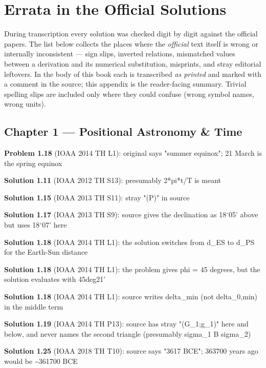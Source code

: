 \chapter{Errata in the Official Solutions}
\label{ch:errata}

During transcription every solution was checked digit by digit against
the official papers. The list below collects the places where the
\emph{official} text itself is wrong or internally inconsistent ---
sign slips, inverted relations, mismatched values between a derivation
and its numerical substitution, misprints, and stray editorial leftovers.
In the body of this book each is transcribed \emph{as printed} and
marked with a comment in the source; this appendix is the reader-facing
summary. Trivial spelling slips are included only where they could
confuse (wrong symbol names, wrong units).

\section*{Chapter 1 --- Positional Astronomy \& Time}

\noindent\textbf{Problem 1.18} (IOAA 2014 TH L1): original says "summer equinox"; 21 March is the spring equinox
\smallskip

\noindent\textbf{Solution 1.11} (IOAA 2012 TH S13): presumably 2*pi*t/T is meant
\smallskip

\noindent\textbf{Solution 1.15} (IOAA 2013 TH S11): stray "(P)" in source
\smallskip

\noindent\textbf{Solution 1.17} (IOAA 2013 TH S9): source gives the declination as 18$^\circ$05' above but uses 18$^\circ$07' here
\smallskip

\noindent\textbf{Solution 1.18} (IOAA 2014 TH L1): the solution switches from d\_ES to d\_PS for the Earth-Sun distance
\smallskip

\noindent\textbf{Solution 1.18} (IOAA 2014 TH L1): the problem gives phi = 45 degrees, but the solution evaluates with 45deg21'
\smallskip

\noindent\textbf{Solution 1.18} (IOAA 2014 TH L1): source writes delta\_min (not delta\_0,min) in the middle term
\smallskip

\noindent\textbf{Solution 1.19} (IOAA 2014 TH P13): source has stray "(G\_1;g\_1)" here and below, and never names the second triangle (presumably sigma\_1 B sigma\_2)
\smallskip

\noindent\textbf{Solution 1.25} (IOAA 2018 TH T10): source says "3617 BCE"; 363700 years ago would be \textasciitilde{}361700 BCE
\smallskip

